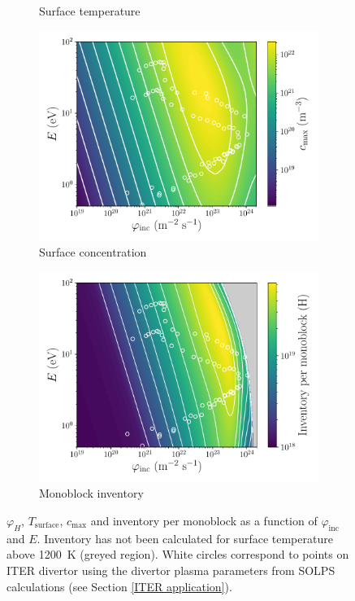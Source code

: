 \begin{figure} [ht]
\begin{subfigure}{0.5\linewidth}
        \caption{Surface temperature}
        \label{fig:T_surf phi E}
    \end{subfigure}
    \begin{subfigure}{0.5\linewidth}
        \centering
        \includegraphics[width=\linewidth]{Figures/Chapter3/monoblocks/parametric_study/c_max_instantaneous.pdf}
        \caption{Surface concentration}
        \label{fig:c_max_instantaneous}
    \end{subfigure}%
    \begin{subfigure}{0.5\linewidth}
        \centering
        \includegraphics[width=\linewidth]{Figures/Chapter3/monoblocks/parametric_study/inventory_phi_E.pdf}
        \caption{Monoblock inventory}
        \label{fig:inventory phi E}
    \end{subfigure}
    \caption{$\varphi_H$, $T_\text{surface}$, $c_\mathrm{max}$ and inventory per monoblock as a function of $\varphi_\mathrm{inc}$ and $E$. Inventory has not been calculated for surface temperature above \SI{1200}{K} (greyed region). White circles correspond to points on ITER divertor using the divertor plasma parameters from SOLPS \cite{bonnin_presentation_2016} calculations (see Section \ref{ITER application}).}
    \label{fig:phi_H T_surf c_max}
\end{figure}

